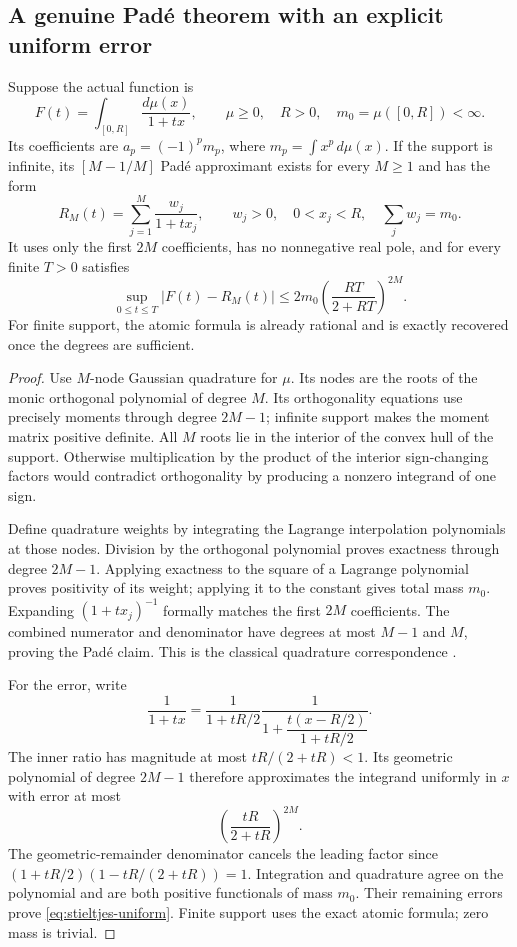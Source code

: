 \subsection{A genuine Pad\'e theorem with an explicit uniform error}
\label{app:compact-stieltjes}

\begin{proposition}
Suppose the actual function is
\[
 F(t)=\int_{[0,R]}\frac{d\mu(x)}{1+tx},
 \qquad \mu\ge0,\quad R>0,\quad m_0=\mu([0,R])<\infty.
\]
Its coefficients are $a_p=(-1)^pm_p$, where $m_p=\int x^p\,d\mu(x)$.
If the support is infinite, its $[M-1/M]$ Pad\'e approximant exists
for every $M\ge1$ and has the form
\[
 R_M(t)=\sum_{j=1}^M\frac{w_j}{1+tx_j},
 \qquad w_j>0,\quad 0<x_j<R,\quad \sum_jw_j=m_0.
\]
It uses only the first $2M$ coefficients, has no nonnegative real pole,
and for every finite $T>0$ satisfies
\begin{equation}
 \sup_{0\le t\le T}|F(t)-R_M(t)|
 \le 2m_0\left(\frac{RT}{2+RT}\right)^{2M}.
 \label{eq:stieltjes-uniform}
\end{equation}
For finite support, the atomic formula is already rational and is
exactly recovered once the degrees are sufficient.
\end{proposition}

\begin{proof}
Use $M$-node Gaussian quadrature for $\mu$. Its nodes are the roots of
the monic orthogonal polynomial of degree $M$. Its orthogonality
equations use precisely moments through degree $2M-1$; infinite support
makes the moment matrix positive definite. All $M$ roots lie in the
interior of the convex hull of the support. Otherwise multiplication
by the product of the interior sign-changing factors would contradict
orthogonality by producing a nonzero integrand of one sign.

Define quadrature weights by integrating the Lagrange interpolation
polynomials at those nodes. Division by the orthogonal polynomial
proves exactness through degree $2M-1$. Applying exactness to the square
of a Lagrange polynomial proves positivity of its weight; applying it
to the constant gives total mass $m_0$. Expanding $(1+tx_j)^{-1}$
formally matches the first $2M$ coefficients. The combined numerator
and denominator have degrees at most $M-1$ and $M$, proving the Pad\'e
claim. This is the classical quadrature correspondence \cite{AllenChui}.

For the error, write
\[
 \frac1{1+tx}=\frac1{1+tR/2}
 \frac1{1+\dfrac{t(x-R/2)}{1+tR/2}}.
\]
The inner ratio has magnitude at most $tR/(2+tR)<1$. Its geometric
polynomial of degree $2M-1$ therefore approximates the integrand
uniformly in $x$ with error at most
\[
 \left(\frac{tR}{2+tR}\right)^{2M}.
\]
The geometric-remainder denominator cancels the leading factor since
$(1+tR/2)(1-tR/(2+tR))=1$. Integration and quadrature agree on the
polynomial and are both positive functionals of mass $m_0$. Their
remaining errors prove \eqref{eq:stieltjes-uniform}. Finite support
uses the exact atomic formula; zero mass is trivial.
\end{proof}


